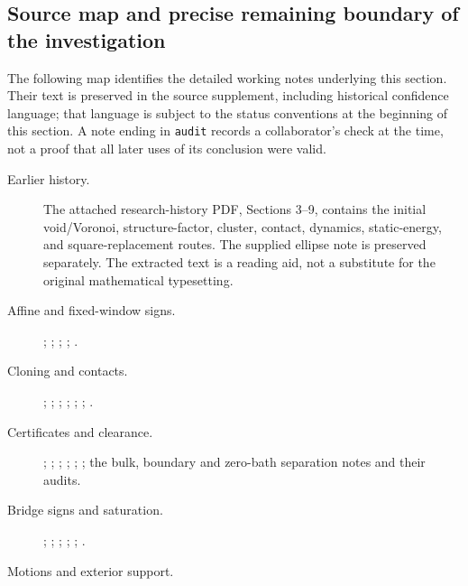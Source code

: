 \documentclass[11pt,a4paper]{article}
\theoremstyle{definition}
\theoremstyle{remark}
\numberwithin{equation}{section}
\begin{document}
\subsection{Source map and precise remaining boundary of the investigation}
\label{br:sourcemap}

The following map identifies the detailed working notes underlying this
section.  Their text is preserved in the source supplement, including
historical confidence language; that language is subject to the status
conventions at the beginning of this section.  A note ending in
\texttt{audit} records a collaborator's check at the time, not a proof
that all later uses of its conclusion were valid.

\begin{description}
\item[Earlier history.]
The attached research-history PDF, Sections 3--9, contains the initial
void/Voronoi, structure-factor, cluster, contact, dynamics, static-energy,
and square-replacement routes.  The supplied ellipse note is preserved
separately.  The extracted text is a reading aid, not a substitute for
the original mathematical typesetting.
\item[Affine and fixed-window signs.]
;
;
;
;
.
\item[Cloning and contacts.]
;
;
;
;
;
;
.
\item[Certificates and clearance.]
;
;
;
;
;
;
the bulk, boundary and zero-bath separation notes and their audits.
\item[Bridge signs and saturation.]
;
;
;
;
;
.
\item[Motions and exterior support.]

\end{description}
\end{document}
